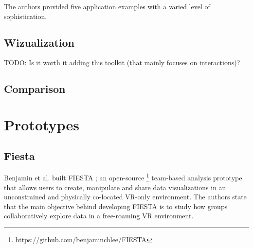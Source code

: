 \documentclass{vgtc}                          %
\begin{document}
\noindent The authors provided five application examples with a varied level of
sophistication.

\subsection{Wizualization}

TODO: Is it worth it adding this toolkit (that mainly focuses on interactions)?

\subsection{Comparison}

\section{Prototypes}

\subsection{Fiesta}

\noindent Benjamin et al. built FIESTA \cite{fiesta_prototype}; an open-source
\footnote{https://github.com/benjaminchlee/FIESTA} team-based analysis
prototype that allows users to create, manipulate and share data visualizations
in an unconstrained and physically co-located VR-only environment. The authors
state that the main objective behind developing FIESTA is to study how groups
collaboratively explore data in a free-roaming VR environment.

\medskip
\end{document}
